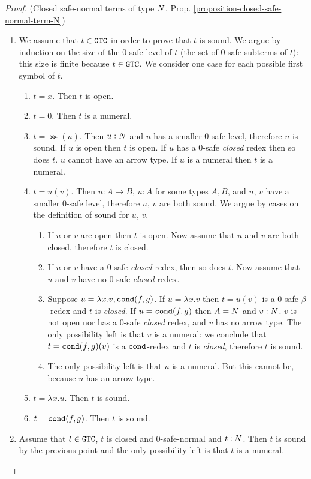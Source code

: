 \begin{proof}(Closed safe-normal terms of type ${N}$, 
Prop. \ref{proposition-closed-safe-normal-term-N})
\begin{enumerate}
\item
We assume that $t \in {\tt GTC}$ in order to prove that $t$ is sound.
We argue by  induction on the size of the $0$-safe level of $t$ (the set of $0$-safe subterms
of $t$): this size is finite because $t \in {\tt GTC}$. 
We consider one case for each possible first symbol of $t$.
\begin{enumerate}
\item
$t =x$. Then $t$ is open.

\item
$t=0$. Then $t$ is a numeral.

\item
$t = \Succ(u)$. Then $u:{N}$ and $u$ has a smaller $0$-safe level, therefore $u$ is sound. 
If $u$ is open then $t$ is open. If $u$ has a $0$-safe \emph{closed} 
redex then so does $t$. $u$ cannot have an arrow type. If $u$
is a numeral then $t$ is a numeral.

\item
$t=u(v)$. Then $u:A \rightarrow B$, $u:A$ for some types $A, B$, 
and $u$, $v$ have a smaller $0$-safe level, therefore $u$, $v$ are both sound. 
We argue by cases on the definition of sound for $u$, $v$.
\begin{enumerate}
\item
If $u$ or $v$ are open then $t$ is open. 
Now assume that $u$ and $v$ are both closed, therefore $t$ is closed.
\item
If $u$ or $v$ have a $0$-safe \emph{closed} redex, then so does $t$.
Now assume that $u$ and $v$ have no $0$-safe \emph{closed} redex.
\item
Suppose $u = \lambda x.v, {\tt cond}(f,g)$. 
If $u = \lambda x.v$ then $t=u(v)$ is a $0$-safe $\beta$-redex and $t$ is \emph{closed}.
If $u = {\tt cond}(f,g)$ then $A = {N}$ and $v:{N}$. 
$v$ is not open nor has a $0$-safe \emph{closed} redex, and $v$ has no arrow type. 
The only possibility left is that $v$ is a numeral: 
we conclude that $t={\tt cond}(f,g)(v)$ is a ${\tt cond}$-redex and $t$ is \emph{closed},
therefore $t$ is sound.
\item
The only possibility left is that $u$ is a numeral. 
But this cannot be, because $u$ has an arrow type.
\end{enumerate}

\item
$t = \lambda x.u$. Then $t$ is sound.

\item
$t = {\tt cond}(f,g)$. Then $t$ is sound.
\end{enumerate}

\item
Assume that $t \in {\tt GTC}$, $t$ is closed and $0$-safe-normal and $t:{N}$.
Then $t$ is sound by the previous point and the only possibility left is that $t$ is 
a numeral.
\end{enumerate}
\end{proof}


